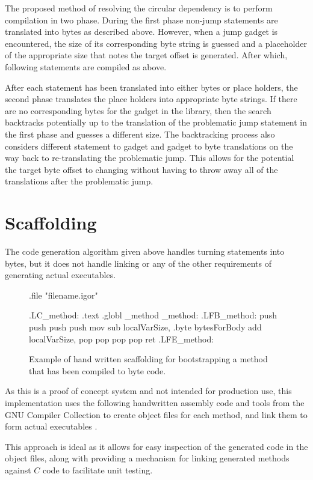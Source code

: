    The proposed method of resolving the circular dependency is to perform
    compilation in two phase. During the first phase non-jump statements are
    translated into bytes as described above. However, when a jump gadget is
    encountered, the size of its corresponding byte string is guessed and a
    placeholder of the appropriate size that notes the target offset is
    generated. After which, following statements are compiled as above.

    After each statement has been translated into either bytes or place holders,
    the second phase translates the place holders into appropriate byte strings.
    If there are no corresponding bytes for the gadget in the library, then the
    search backtracks potentially up to the translation of the problematic jump
    statement in the first phase and guesses a different size. The backtracking
    process also considers different statement to gadget and gadget to byte
    translations on the way back to re-translating the problematic jump. This
    allows for the potential the target byte offset to changing without having
    to throw away all of the translations after the problematic jump.

    \section{Scaffolding}

    The code generation algorithm given above handles turning statements into
    bytes, but it does not handle linking or any of the other requirements of
    generating actual executables.

    \begin{figure}
        \begin{vcode}
    .file "filename.igor"
    
    .LC_method:
        .text
        .globl    _method
    _method:
    .LFB_method:
        push    %
        push    %
        push    %
        push    %
        mov    %
        sub    localVarSize, %
        .byte  bytesForBody
        add    localVarSize, %
        pop    %
        pop    %
        pop    %
        pop    %
        ret
    .LFE_method:
        \end{vcode}
        \caption[Example of hand written scaffolding.]{Example of hand written scaffolding for bootstrapping a method
        that has been compiled to byte code.}
        \label{tab:method-statements}
    \end{figure}

    As this is a proof of concept system and not intended for production use,
    this implementation uses the following handwritten assembly code and tools
    from the GNU Compiler Collection to create object files for each method, and
    link them to form actual executables \cite{gcc}.

    This approach is ideal as it allows for easy inspection of the generated
    code in the object files, along with providing a mechanism for linking
    generated methods against $C$ code to facilitate unit testing.

